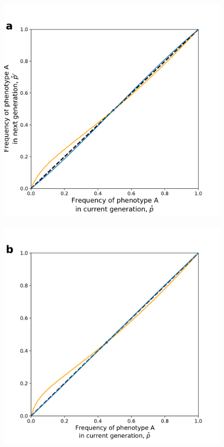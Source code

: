 \documentclass[12pt]{extarticle}
\begin{document}
{%
\begin{figure}[h]
  \centering
    \includegraphics[scale=0.45]{coexistence_without_oblique.pdf}~
    \includegraphics[scale=0.45]{coexistence_with_oblique.pdf}

\end{figure}}
\end{document}
